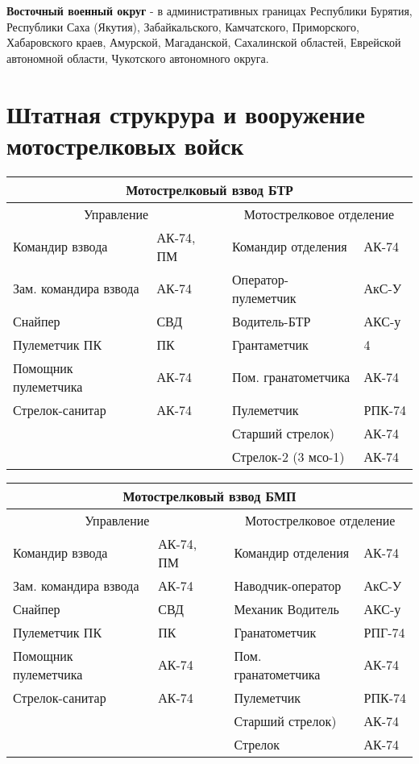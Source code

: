 \documentclass[12pt,a4paper]{report}
\begin{document}
\textbf{Восточный военный округ} - в административных границах Республики Бурятия, Республики Саха (Якутия), Забайкальского, Камчатского, Приморского, Хабаровского краев, Амурской, Магаданской, Сахалинской областей, Еврейской автономной области, Чукотского автономного округа.

\section{Штатная струкрура и вооружение мотострелковых войск}
\begin{center}
\begin{tabular}{| l | l|l |l|}
\hline
\multicolumn{4}{|c|}{Мотострелковый взвод БТР}\\ \hline
\multicolumn{2}{|c|}{Управление} & \multicolumn{2}{|c|}{Мотострелковое отделение}\\ \hline
Командир взвода &  АК-74, ПМ  &  Командир отделения & АК-74 \\ \hline
Зам. командира взвода & АК-74  & Оператор-пулеметчик & АкС-У\\ \hline
Снайпер & СВД &					 Водитель-БТР & АКС-у\\ 		   \hline
Пулеметчик ПК & ПК &			 Грантаметчик & 4     \\ \hline
Помощник пулеметчика & АК-74  &  Пом. гранатометчика & АК-74        \\ \hline
Стрелок-санитар & АК-74  &		 Пулеметчик & РПК-74    \\ \hline
\multicolumn{2}{|l|}{  } &   	 Старший стрелок) & АК-74 \\ \hline 	
\multicolumn{2}{|l|}{  } &   	 Стрелок-2 (3 мсо-1) & АК-74 \\ \hline 
\end{tabular}
\end{center}
\begin{center}
\begin{tabular}{| l | l|l |l|}
\hline
\multicolumn{4}{|c|}{Мотострелковый взвод БМП}\\ \hline
\multicolumn{2}{|c|}{Управление} & \multicolumn{2}{|c|}{Мотострелковое отделение}\\ \hline
Командир взвода &  АК-74, ПМ  &  Командир отделения & АК-74 \\ \hline
Зам. командира взвода & АК-74  & Наводчик-оператор & АкС-У\\ \hline
Снайпер & СВД &					 Механик Водитель & АКС-у\\ 		   \hline
Пулеметчик ПК & ПК &			 Гранатометчик & РПГ-74     \\ \hline
Помощник пулеметчика & АК-74  &  Пом. гранатометчика & АК-74        \\ \hline
Стрелок-санитар & АК-74  &		 Пулеметчик & РПК-74    \\ \hline
\multicolumn{2}{|l|}{  } &   	 Старший стрелок) & АК-74 \\ \hline 	
\multicolumn{2}{|l|}{  } &   	 Стрелок & АК-74 \\ \hline 
\end{tabular}
\end{center}
\end{document}
